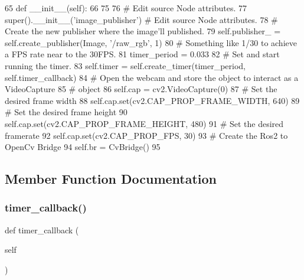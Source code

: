 \begin{DoxyCode}
65     \textcolor{keyword}{def }\_\_init\_\_(self):
66         
75 
76         \textcolor{comment}{# Edit source Node attributes.}
77         super().\_\_init\_\_(\textcolor{stringliteral}{'image\_publisher'}) \textcolor{comment}{# Edit source Node attributes.}
78         \textcolor{comment}{# Create the new publisher where the image'll published.}
79         self.publisher\_ = self.create\_publisher(Image, \textcolor{stringliteral}{'/raw\_rgb'}, 1)
80         \textcolor{comment}{# Something like 1/30 to achieve a FPS rate near to the 30FPS.}
81         timer\_period = 0.033
82         \textcolor{comment}{# Set and start running the timer.}
83         self.timer = self.create\_timer(timer\_period, self.timer\_callback)
84         \textcolor{comment}{# Open the webcam and store the object to interact as a VideoCapture}
85         \textcolor{comment}{# object}
86         self.cap = cv2.VideoCapture(0)
87         \textcolor{comment}{# Set the desired frame width}
88         self.cap.set(cv2.CAP\_PROP\_FRAME\_WIDTH, 640)
89         \textcolor{comment}{# Set the desired frame height}
90         self.cap.set(cv2.CAP\_PROP\_FRAME\_HEIGHT, 480)
91         \textcolor{comment}{# Set the desired framerate}
92         self.cap.set(cv2.CAP\_PROP\_FPS, 30)
93         \textcolor{comment}{# Create the Ros2 to OpenCv Bridge}
94         self.br = CvBridge()
95 
\end{DoxyCode}


\subsection{Member Function Documentation}
\mbox{\label{classtoxic__vision_1_1webcam__pub_1_1ImagePublisher_a9692d7a212fa89bc61dacc687e826097}} 
\subsubsection{\texorpdfstring{timer\+\_\+callback()}{timer\_callback()}}
{\footnotesize\ttfamily def timer\+\_\+callback (\begin{DoxyParamCaption}\item[{}]{self }\end{DoxyParamCaption})}



